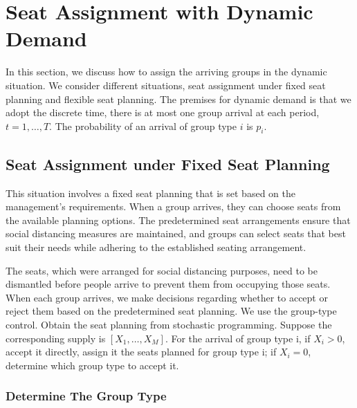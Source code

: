 \section{Seat Assignment with Dynamic Demand}\label{sec_dynamic}
In this section, we discuss how to assign the arriving groups in the dynamic situation. We consider different situations, seat assignment under fixed seat planning and flexible seat planning. The premises for dynamic demand is that we adopt the discrete time, there is at most one group arrival at each period, $t = 1, \ldots, T$. The probability of an arrival of group type $i$ is $p_i$.


\subsection{Seat Assignment under Fixed Seat Planning}
This situation involves a fixed seat planning that is set based on the management's requirements. When a group arrives, they can choose seats from the available planning options. The predetermined seat arrangements ensure that social distancing measures are maintained, and groups can select seats that best suit their needs while adhering to the established seating arrangement.

The seats, which were arranged for social distancing purposes, need to be dismantled
before people arrive to prevent them from occupying those seats. When each group
arrives, we make decisions regarding whether to accept or reject them based on the
predetermined seat planning. We use the group-type control. Obtain the seat planning from stochastic programming. Suppose the corresponding supply is $[X_1, \ldots, X_M]$. For the arrival of group type i, if $X_i > 0$, accept it directly, assign it the seats planned for group type i; if $X_i = 0$, determine which group type to accept it.

\subsubsection{Determine The Group Type}\label{nested_policy}

